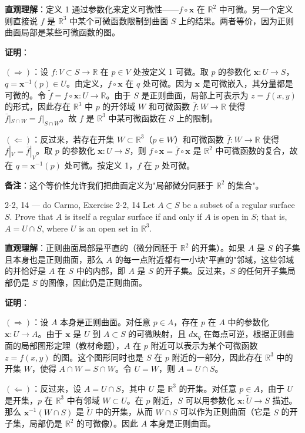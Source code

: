 \begin{solution}
\textbf{直观理解}：定义 1 通过参数化来定义可微性——$f \circ \mathbf{x}$ 在 $\mathbb{R}^2$ 中可微。另一个定义则直接说 $f$ 是 $\mathbb{R}^3$ 中某个可微函数限制到曲面 $S$ 上的结果。两者等价，因为正则曲面局部是某些可微函数的图。

\textbf{证明}：

$(\Rightarrow)$：设 $f: V \subset S \to \mathbb{R}$ 在 $p \in V$ 处按定义 1 可微。取 $p$ 的参数化 $\mathbf{x}: U \to S$，$q = \mathbf{x}^{-1}(p) \in U$。由定义，$f \circ \mathbf{x}$ 在 $q$ 处可微。因为 $\mathbf{x}$ 是可微嵌入，其分量都是可微的。令 $\tilde{f} = f \circ \mathbf{x}: U \to \mathbb{R}$。由于 $S$ 是正则曲面，局部上可表示为 $z = f(x,y)$ 的形式，因此存在 $\mathbb{R}^3$ 中 $p$ 的开邻域 $W$ 和可微函数 $\bar{f}: W \to \mathbb{R}$ 使得 $\bar{f}|_{S \cap W} = f|_{S \cap W}$。故 $f$ 是 $\mathbb{R}^3$ 中某可微函数在 $S$ 上的限制。

$(\Leftarrow)$：反过来，若存在开集 $W \subset \mathbb{R}^3$（$p \in W$）和可微函数 $\bar{f}: W \to \mathbb{R}$ 使得 $f|_V = \bar{f}|_V$。取 $p$ 的参数化 $\mathbf{x}: U \to S$，则 $f \circ \mathbf{x} = \bar{f} \circ \mathbf{x}$ 是 $\mathbb{R}^2$ 中可微函数的复合，故在 $q = \mathbf{x}^{-1}(p)$ 处可微。按定义 1，$f$ 在 $p$ 处可微。

\textbf{备注}：这个等价性允许我们把曲面定义为"局部微分同胚于 $\mathbb{R}^2$ 的集合"。
\end{solution}

\begin{exercise}{2-2, 14 — do Carmo, Exercise 2-2, 14}
Let $A \subset S$ be a subset of a regular surface $S$. Prove that $A$ is itself a regular surface if and only if $A$ is open in $S$; that is, $A = U \cap S$, where $U$ is an open set in $\mathbb{R}^3$.
\end{exercise}

\begin{solution}
\textbf{直观理解}：正则曲面局部是平直的（微分同胚于 $\mathbb{R}^2$ 的开集）。如果 $A$ 是 $S$ 的子集且本身也是正则曲面，那么 $A$ 的每一点附近都有一小块"平直的"邻域，这些邻域的并恰好是 $A$ 在 $S$ 中的内部，即 $A$ 是 $S$ 的开子集。反过来，$S$ 的任何开子集局部仍是 $S$ 的图像，因此仍是正则曲面。

\textbf{证明}：

$(\Rightarrow)$：设 $A$ 本身是正则曲面。对任意 $p \in A$，存在 $p$ 在 $A$ 中的参数化 $\mathbf{x}: U \to A$。由于 $\mathbf{x}$ 是 $U$ 到 $A \subset S$ 的可微映射，且 $d\mathbf{x}_q$ 在每点可逆，根据正则曲面的局部图形定理（教材命题），$A$ 在 $p$ 附近可以表示为某个可微函数 $z = f(x,y)$ 的图。这个图形同时也是 $S$ 在 $p$ 附近的一部分，因此存在 $\mathbb{R}^3$ 中的开集 $W$，使得 $A \cap W = S \cap W$。令 $U = W$，则 $A = U \cap S$。

$(\Leftarrow)$：反过来，设 $A = U \cap S$，其中 $U$ 是 $\mathbb{R}^3$ 的开集。对任意 $p \in A$，由于 $U$ 是开集，$p$ 在 $\mathbb{R}^3$ 中有邻域 $W \subset U$。在 $p$ 附近，$S$ 可以用参数化 $\mathbf{x}: \tilde{U} \to S$ 描述。那么 $\mathbf{x}^{-1}(W \cap S)$ 是 $\tilde{U}$ 中的开集，从而 $W \cap S$ 可以作为正则曲面（它是 $S$ 的开子集，局部仍是 $\mathbb{R}^2$ 的可微像）。因此 $A$ 本身是正则曲面。
\end{solution}

